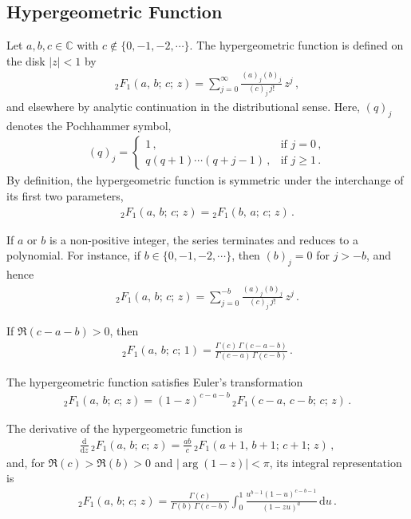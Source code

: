 \documentclass[aps,twocolumn,nofootinbib]{revtex4}
\begin{document}
{\begin{appendix}
\subsection{Hypergeometric Function}\label{A-Hyper-Fun}

Let $a,b,c\in\mathbb{C}$ with $c\notin\{0,-1,-2,\cdots\}$. The hypergeometric function is defined on the disk $|z|<1$ by 
\begin{align}\label{HG-def}
    {}_2F_1(a,\, b;\, c;\, z) = \sum_{j=0}^{\infty} \frac{(a)_j(b)_j}{(c)_j\,j!}\,z^j\,,
\end{align}
and elsewhere by analytic continuation in the distributional sense. Here, $(q)_j$ denotes the Pochhammer symbol,
\begin{align}\label{miriam8}
    (q)_j = 
    \begin{cases}
        1\,, & \text{if } j=0\,, \\[3pt]
        q(q+1)\cdots(q+j-1)\,, & \text{if } j\geqslant 1\,.
    \end{cases}
\end{align}
By definition, the hypergeometric function is symmetric under the interchange of its first two parameters,
\begin{align}
    {}_2F_1(a,\, b;\, c;\, z) = {}_2F_1(b,\, a;\, c;\, z) \,.
\end{align}

If $a$ or $b$ is a non-positive integer, the series terminates and reduces to a polynomial. For instance, if $b\in\{0,-1,-2,\cdots\}$, then $(b)_j=0$ for $j>-b$, and hence
\begin{align}\label{kha20}
    {}_2F_1(a,\, b;\, c;\, z) = \sum_{j=0}^{-b} \frac{(a)_j(b)_j}{(c)_j\,j!}\,z^j\,.
\end{align}

If $\Re(c-a-b)>0$, then
\begin{align}\label{Chu-Vandermonde Identity1}
    {}_2F_1(a,\, b;\, c;\, 1)= \frac{\Gamma(c) \,\Gamma(c-a-b)}{\Gamma(c-a) \,\Gamma(c-b)}\,.
\end{align}

The hypergeometric function satisfies Euler's transformation
\begin{align} \label{Euler's transformation}
     {}_2F_1(a,\,b;\,c;\,z) = (1-z)^{c-a-b} \, {}_2F_1(c-a,\, c-b;\, c;\, z)\,. 
\end{align}

The derivative of the hypergeometric function is
\begin{align}\label{deriv}
    \frac{\mathrm{d}}{\mathrm{d}z}\,{}_2F_1^{}(a,\, b;\, c;\, z)=\frac{ab}{c}\,{}_2F_1^{}(a+1,\,b+1;\,c+1;\,z)\,,
\end{align}
and, for $\Re(c) > \Re(b)>0$ and $|\arg(1-z)|<\pi$, its integral representation is
\begin{align}
    {}_2F_1^{}(a,\, b;\, c;\, z)=\frac{\Gamma(c)}{\Gamma(b) \,\Gamma(c-b)}\int_0^1 \frac{u_{}^{b-1}(1-u)_{}^{c-b-1}}{(1-zu)_{}^{a}}\,\mathrm{d}u\,.\label{Eu-int-Re}
\end{align}


\end{appendix}}
\end{document}
